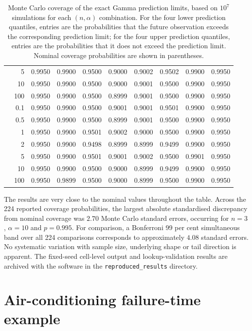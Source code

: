 \documentclass[11pt]{article}
\theoremstyle{remark}
\begin{document}
\begin{table}[p]
\begin{tabular}{rrrrrrrrrr}
 & 5 & 0.9950 & 0.9900 & 0.9500 & 0.9000 & 0.9002 & 0.9502 & 0.9900 & 0.9950 \\
 & 10 & 0.9950 & 0.9900 & 0.9500 & 0.9000 & 0.9001 & 0.9500 & 0.9900 & 0.9950 \\
 & 100 & 0.9950 & 0.9900 & 0.9500 & 0.8999 & 0.9001 & 0.9500 & 0.9900 & 0.9950 \\
\addlinespace
20 & 0.1 & 0.9950 & 0.9900 & 0.9500 & 0.9001 & 0.9001 & 0.9501 & 0.9900 & 0.9950 \\
 & 0.5 & 0.9950 & 0.9900 & 0.9500 & 0.8999 & 0.9001 & 0.9500 & 0.9900 & 0.9950 \\
 & 1 & 0.9950 & 0.9900 & 0.9501 & 0.9002 & 0.9000 & 0.9500 & 0.9900 & 0.9950 \\
 & 2 & 0.9950 & 0.9900 & 0.9498 & 0.8999 & 0.8999 & 0.9499 & 0.9900 & 0.9950 \\
 & 5 & 0.9950 & 0.9900 & 0.9501 & 0.9001 & 0.9002 & 0.9500 & 0.9901 & 0.9950 \\
 & 10 & 0.9950 & 0.9900 & 0.9500 & 0.9000 & 0.8999 & 0.9499 & 0.9900 & 0.9950 \\
 & 100 & 0.9950 & 0.9899 & 0.9500 & 0.9000 & 0.8999 & 0.9500 & 0.9900 & 0.9950 \\
\bottomrule
\end{tabular}
\caption{Monte Carlo coverage of the exact Gamma prediction limits, based on $10^7$ simulations for each $(n,\alpha)$ combination. For the four lower prediction quantiles, entries are the probabilities that the future observation exceeds the corresponding prediction limit; for the four upper prediction quantiles, entries are the probabilities that it does not exceed the prediction limit. Nominal coverage probabilities are shown in parentheses.}
\label{tab:gamma_coverage}
\end{table}
\FloatBarrier

The results are very close to the nominal values throughout the table. Across the 224 reported coverage probabilities, the largest absolute standardised discrepancy from nominal coverage was $2.70$ Monte Carlo standard errors, occurring for $n=3$, $\alpha=10$ and $p=0.995$. For comparison, a Bonferroni 99 per cent simultaneous band over all 224 comparisons corresponds to approximately $4.08$ standard errors. No systematic variation with sample size, underlying shape or tail direction is apparent. The fixed-seed cell-level output and lookup-validation results are archived with the software in the \texttt{reproduced\_results} directory.

\section{Air-conditioning failure-time example}
\end{document}
